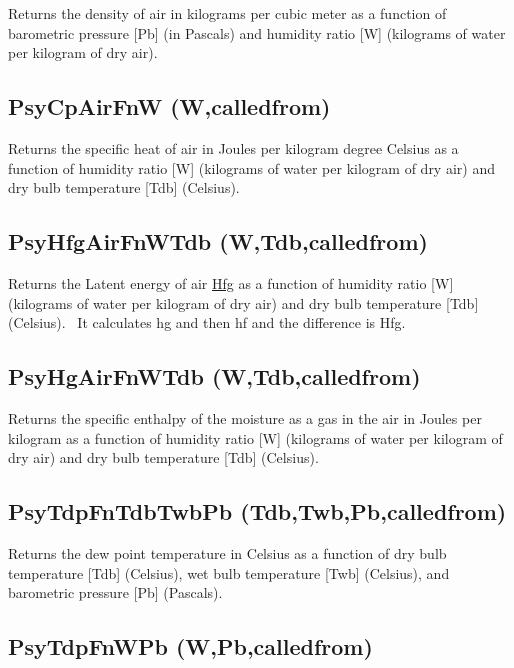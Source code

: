 Returns the density of air in kilograms per cubic meter as a function of barometric pressure {[}Pb{]} (in Pascals) and humidity ratio {[}W{]} (kilograms of water per kilogram of dry air).

\subsection{PsyCpAirFnW (W,calledfrom)}\label{psycpairfnw-wcalledfrom}

Returns the specific heat of air in Joules per kilogram degree Celsius as a function of humidity ratio {[}W{]} (kilograms of water per kilogram of dry air) and dry bulb temperature {[}Tdb{]} (Celsius).

\subsection{PsyHfgAirFnWTdb (W,Tdb,calledfrom)}\label{psyhfgairfnwtdb-wtdbcalledfrom}

Returns the Latent energy of air \href{Joules\%20per\%20kilogram}{Hfg} as a function of humidity ratio {[}W{]} (kilograms of water per kilogram of dry air) and dry bulb temperature {[}Tdb{]} (Celsius).~ It calculates hg and then hf and the difference is Hfg.

\subsection{PsyHgAirFnWTdb (W,Tdb,calledfrom)}\label{psyhgairfnwtdb-wtdbcalledfrom}

Returns the specific enthalpy of the moisture as a gas in the air in Joules per kilogram as a function of humidity ratio {[}W{]} (kilograms of water per kilogram of dry air) and dry bulb temperature {[}Tdb{]} (Celsius).

\subsection{PsyTdpFnTdbTwbPb (Tdb,Twb,Pb,calledfrom)}\label{psytdpfntdbtwbpb-tdbtwbpbcalledfrom}

Returns the dew point temperature in Celsius as a function of dry bulb temperature {[}Tdb{]} (Celsius), wet bulb temperature {[}Twb{]} (Celsius), and barometric pressure {[}Pb{]} (Pascals).

\subsection{PsyTdpFnWPb (W,Pb,calledfrom)}\label{psytdpfnwpb-wpbcalledfrom}

